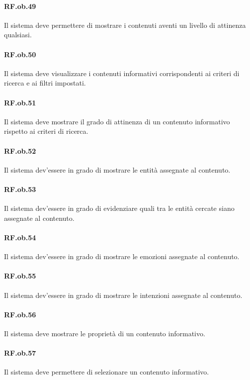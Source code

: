 \documentclass[10pt,a4paper,headinclude,footinclude,hidelinks]{scrreprt} %
\begin{document}
	\paragraph{RF.ob.49} Il sistema deve permettere di mostrare i contenuti aventi un livello di attinenza qualsiasi.

	\paragraph{RF.ob.50} Il sistema deve visualizzare i contenuti informativi corrispondenti ai criteri di ricerca e ai filtri impostati.

	\paragraph{RF.ob.51} Il sistema deve mostrare il grado di attinenza di un contenuto informativo rispetto ai criteri di ricerca.

	\paragraph{RF.ob.52} Il sistema dev'essere in grado di mostrare le entità assegnate al contenuto.

	\paragraph{RF.ob.53} Il sistema dev'essere in grado di evidenziare quali tra le entità cercate siano assegnate al contenuto.

	\paragraph{RF.ob.54} Il sistema dev'essere in grado di mostrare le emozioni assegnate al contenuto.

	\paragraph{RF.ob.55} Il sistema dev'essere in grado di mostrare le intenzioni assegnate al contenuto.

	\paragraph{RF.ob.56} Il sistema deve mostrare le proprietà di un contenuto informativo.

	\paragraph{RF.ob.57} Il sistema deve permettere di selezionare un contenuto informativo.
\end{document}
